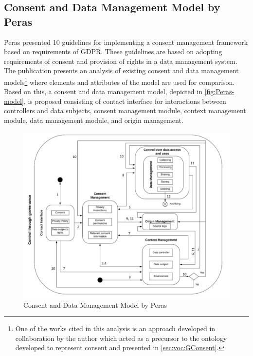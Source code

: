 \subsection*{Consent and Data Management Model by Peras}
Peras \cite{peras_guidelines_2018} presented 10 guidelines for implementing a consent management framework based on requirements of GDPR. These guidelines are based on adopting requirements of consent and provision of rights in a data management system. The publication presents an analysis of existing consent and data management models\footnote{One of the works cited in this analysis is an approach developed in collaboration by the author \cite{fatema_compliance_2017} which acted as a precursor to the ontology developed to represent consent and presented in \autoref{sec:voc:GConsent}.} where elements and attributes of the model are used for comparison. Based on this, a consent and data management model, depicted in \autoref{fig:Peras-model}, is proposed consisting of contact interface for interactions between controllers and data subjects, consent management module, context management module, data management module, and origin management.
\begin{figure}[htbp]
    \centering
    \includegraphics[width=0.8\linewidth]{img/Peras_model.png}
    \caption{Consent and Data Management Model by Peras \cite{peras_guidelines_2018}}
    \label{fig:Peras-model}
\end{figure}

